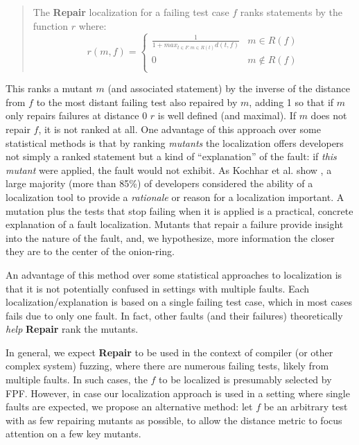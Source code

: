 \begin{quote}
The {\bf Repair} localization for a failing test case $f$ ranks
statements by the function $r$ where:
\[
r(m,f) = 
\begin{cases}
\frac{1}{1 + max_{t \in F: m \in R(t)} d(t,f)} & m \in R(f)\\
0 & m \not\in R(f)\\
\end{cases}
\]
\end{quote}

This ranks a mutant $m$ (and associated statement) by the inverse of the distance
from $f$ to the most distant failing test also repaired by $m$, adding 1
so that if $m$ only repairs failures at distance 0 $r$ is well defined
(and maximal).
If $m$ does not repair $f$, it is not ranked at all.  One advantage of
this approach over some statistical methods is that by
ranking \emph{mutants} the localization offers developers not simply a
ranked statement but a kind of ``explanation'' \cite{GroceError} of the fault:  if \emph{this
mutant} were applied, the fault would not exhibit.  As Kochhar et
al. show \cite{Kochhar}, a large majority (more than 85\%) of developers considered
the ability of a localization tool to provide a \emph{rationale} or
reason for a localization important.  A mutation plus the tests that
stop failing when it is applied is a practical, concrete explanation
of a fault localization.  Mutants that repair a failure provide insight 
into the nature of the fault, and, we hypothesize, more information the 
closer they are to the center of the onion-ring. 

An advantage of this method over some statistical approaches to
localization is that it is not potentially confused in
settings with multiple faults.  Each localization/explanation is based
on a single failing test case, which in most cases fails due to only one
fault.  In fact, other faults (and their failures) theoretically \emph{help} {\bf Repair} rank the mutants.

In general, we expect {\bf Repair} to be used in the context of
compiler (or other complex system) fuzzing, where there are numerous
failing tests, likely from multiple faults.  In such cases, the $f$ to
be localized is presumably selected by FPF.  However, in case our
localization approach is used in a setting where single faults are
expected, we propose an alternative method: let $f$ be an arbitrary
test with as few repairing mutants as possible, to allow the distance
metric to focus attention on a few key mutants. 

